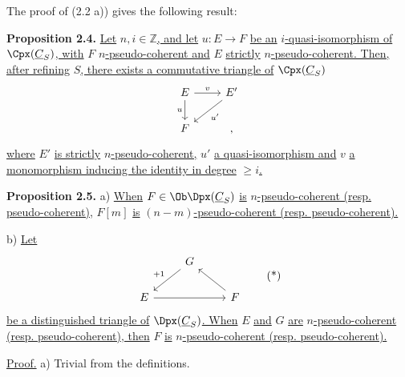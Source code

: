 The proof of (2.2 a)) gives the following result:

\textbf{Proposition 2.4.} \uline{Let} \(n,i\in\mathbb Z\)\uline{, and let} \(u:E\to F\) \uline{be an} \(i\)\uline{-quasi-isomorphism of} \(\Cpx(\underline{C}_S)\)\uline{, with} \(F\) \(n\)\uline{-pseudo-coherent and} \(E\) \uline{strictly} \(n\)\uline{-pseudo-coherent. Then, after refining} \(S\)\uline{, there exists a commutative triangle of} \(\Cpx(\underline{C}_S)\)
\[
\begin{tikzcd}
E \arrow[r,"v"] \arrow[d,"u"'] & E' \arrow[dl,"u'"]\\
F & ,
\end{tikzcd}
\]
\uline{where} \(E'\) \uline{is strictly} \(n\)\uline{-pseudo-coherent,} \(u'\) \uline{a quasi-isomorphism and} \(v\) \uline{a monomorphism inducing the identity in degree} \(\geq i\)\uline{.}

\textbf{Proposition 2.5.} a) \uline{When} \(F\in\Ob\Dpx(\underline{C}_S)\) \uline{is} \(n\)\uline{-pseudo-coherent (resp. pseudo-coherent),} \(F[m]\) \uline{is} \((n-m)\)\uline{-pseudo-coherent (resp. pseudo-coherent).}

%
b) \uline{Let}
%
\[
\begin{tikzcd}
& G \arrow[dl,"+1"'] & \\
E \arrow[rr] && F \arrow[ul]
\end{tikzcd}
\tag{*}
\]
\uline{be a distinguished triangle of} \(\Dpx(\underline{C}_S)\)\uline{. When} \(E\) \uline{and} \(G\) \uline{are} \(n\)\uline{-pseudo-coherent (resp. pseudo-coherent), then} \(F\) \uline{is} \(n\)\uline{-pseudo-coherent (resp. pseudo-coherent).}

\uline{Proof.} a) Trivial from the definitions.

